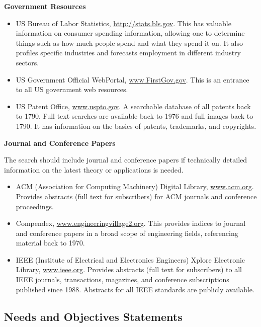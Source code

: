 \textbf{Government Resources}

\begin{itemize}
\item
  US Bureau of Labor Statistics, \url{http://stats.bls.gov}. This has
  valuable information on consumer spending information, allowing one to
  determine things such as how much people spend and what they spend it
  on. It also profiles specific industries and forecasts employment in
  different industry sectors.
\item
  US Government Official WebPortal,
  \href{http://www.FirstGov.gov}{www.FirstGov.gov}. This is an entrance
  to all US government web resources.
\item
  US Patent Office, \href{http://www.uspto.gov}{www.uspto.gov}. A
  searchable database of all patents back to 1790. Full text searches
  are available back to 1976 and full images back to 1790. It has
  information on the basics of patents, trademarks, and copyrights.
\end{itemize}

\textbf{Journal and Conference Papers}

The search should include journal and conference papers if technically
detailed information on the latest theory or applications is needed.

\begin{itemize}
\item
  ACM (Association for Computing Machinery) Digital Library,
  \href{http://www.acm.org}{www.acm.org}. Provides abstracts (full text
  for subscribers) for ACM journals and conference proceedings.
\item
  Compendex,
  \href{http://www.engineeringvillage2.org}{www.engineeringvillage2.org}.
  This provides indices to journal and conference papers in a broad
  scope of engineering fields, referencing material back to 1970.
\item
  IEEE (Institute of Electrical and Electronics Engineers) Xplore
  Electronic Library, \href{http://www.ieee.org}{www.ieee.org}. Provides
  abstracts (full text for subscribers) to all IEEE journals,
  transactions, magazines, and conference subscriptions published since
  1988. Abstracts for all IEEE standards are publicly available.
\end{itemize}

\subsection{Needs and Objectives
Statements}\label{needs-and-objectives-statements}


